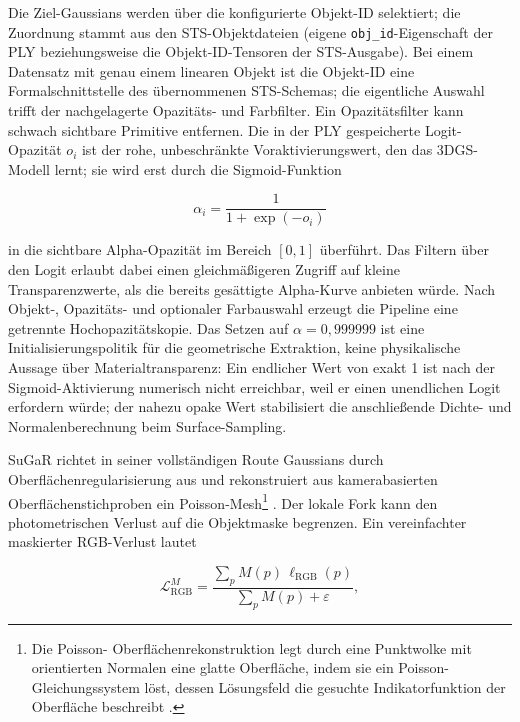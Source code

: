 Die Ziel-Gaussians werden über die konfigurierte Objekt-ID selektiert; die
Zuordnung stammt aus den STS-Objektdateien (eigene \texttt{obj\_id}-Eigenschaft
der PLY beziehungsweise die Objekt-ID-Tensoren der STS-Ausgabe). Bei einem
Datensatz mit genau einem linearen Objekt ist die Objekt-ID eine
Formalschnittstelle des übernommenen STS-Schemas; die eigentliche Auswahl
trifft der nachgelagerte Opazitäts- und Farbfilter. Ein Opazitätsfilter kann
schwach sichtbare Primitive entfernen. Die in der PLY gespeicherte
Logit-Opazität $o_i$ ist der rohe, unbeschränkte Voraktivierungswert, den das
3DGS-Modell lernt; sie wird erst durch die Sigmoid-Funktion

\begin{equation}
	\alpha_i = \frac{1}{1+\exp(-o_i)}
	\label{eq:opacity}
\end{equation}

in die sichtbare Alpha-Opazität im Bereich $[0,1]$ überführt. Das Filtern über
den Logit erlaubt dabei einen gleichmäßigeren Zugriff auf kleine
Transparenzwerte, als die bereits gesättigte Alpha-Kurve anbieten würde. Nach
Objekt-, Opazitäts- und optionaler Farbauswahl erzeugt die Pipeline eine
getrennte Hochopazitätskopie. Das Setzen auf $\alpha=0{,}999999$ ist eine
Initialisierungspolitik für die geometrische Extraktion, keine physikalische
Aussage über Materialtransparenz: Ein endlicher Wert von exakt 1 ist nach der
Sigmoid-Aktivierung numerisch nicht erreichbar, weil er einen unendlichen
Logit erfordern würde; der nahezu opake Wert stabilisiert die anschließende
Dichte- und Normalenberechnung beim Surface-Sampling.

SuGaR richtet in seiner vollständigen Route Gaussians durch
Oberflächenregularisierung aus und rekonstruiert aus kamerabasierten
Oberflächenstichproben ein Poisson-Mesh\footnote{Die Poisson-
Oberflächenrekonstruktion legt durch eine Punktwolke mit orientierten
Normalen eine glatte Oberfläche, indem sie ein Poisson-Gleichungssystem löst,
dessen Lösungsfeld die gesuchte Indikatorfunktion der Oberfläche beschreibt
\parencite{kazhdan2006poisson}.}
\parencite{guedon2024sugar}. Der lokale Fork kann den
photometrischen Verlust auf die Objektmaske begrenzen. Ein vereinfachter
maskierter RGB-Verlust lautet

\begin{equation}
 \mathcal{L}_{\mathrm{RGB}}^{M} =
 \frac{\sum_p M(p)\,\ell_{\mathrm{RGB}}(p)}
			{\sum_p M(p)+\varepsilon},
 \label{eq:masked-rgb-loss}
\end{equation}

